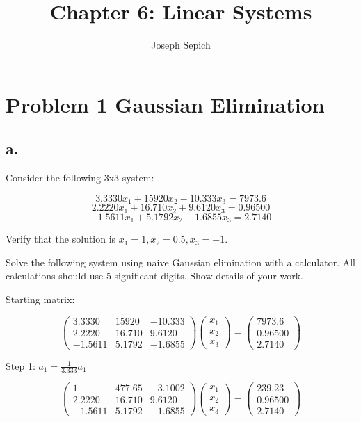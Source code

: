 \documentclass[]{article}
\title{Chapter 6: Linear Systems}
\subtitle{Joseph Sepich}
\author{}
\date{}
\begin{document}
\maketitle

{
\setcounter{tocdepth}{2}
\tableofcontents
}
\section{Problem 1 Gaussian
Elimination}\label{problem-1-gaussian-elimination}

\subsection{a.}\label{a.}

Consider the following 3x3 system:

\[3.3330x_1 + 15920x_2 - 10.333x_3 = 7973.6\]
\[2.2220x_1 + 16.710x_2 + 9.6120x_3 = 0.96500\]
\[-1.5611x_1 + 5.1792x_2 - 1.6855x_3 = 2.7140\]

Verify that the solution is \(x_1 = 1, x_2 = 0.5, x_3 = -1\).

Solve the following system using naive Gaussian elimination with a
calculator. All calculations should use 5 significant digits. Show
details of your work.

Starting matrix:

\[
\left(\begin{array}{ccc} 
3.3330 & 15920 & -10.333\\
2.2220 & 16.710 & 9.6120\\
-1.5611 & 5.1792 & -1.6855
\end{array}\right)
\left(\begin{array}{c} 
x_1 \\
x_2 \\
x_3
\end{array}\right) =
\left(\begin{array}{c}
7973.6 \\
0.96500 \\
2.7140
\end{array}\right)
\]

Step 1: \(a_1 = \frac1{3.333} a_1\)

\[
\left(\begin{array}{ccc} 
1 & 477.65 & -3.1002\\
2.2220 & 16.710 & 9.6120\\
-1.5611 & 5.1792 & -1.6855
\end{array}\right)
\left(\begin{array}{c} 
x_1 \\
x_2 \\
x_3
\end{array}\right) =
\left(\begin{array}{c}
239.23 \\
0.96500 \\
2.7140
\end{array}\right)
\]
\end{document}
